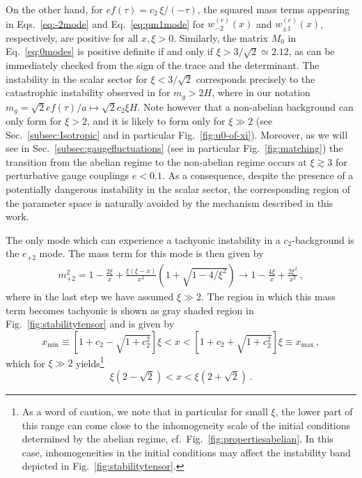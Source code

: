 On the other hand, for $e f(\tau) = c_2 \,  \xi/(- \tau)$, the squared mass terms appearing in Eqs.~\eqref{eq:-2mode} and Eq.~\eqref{eq:pm1mode} for $w_{-2}^{(e)}(x)$ and $w_{\pm1}^{(e)}(x)$, respectively, are positive for all $x, \xi > 0$. Similarly, the matrix $M_0$ in Eq.~\eqref{eq:0modes} is positive definite if and only if $\xi > 3/\sqrt{2} \simeq 2.12$, as can be immediately checked from the sign of the trace and the determinant. The instability in the scalar sector for $\xi < 3/\sqrt{2}$ corresponds precisely to the catastrophic instability observed in \cite{Dimastrogiovanni:2012ew} for $m_g > 2 H$, where in our notation $m_g = \sqrt{2} e f(\tau)/a \mapsto \sqrt{2} c_2 \xi H$. Note however that a non-abelian background can only form for $\xi > 2$, and it is likely to form only for $\xi \gg 2$ (see Sec.~\ref{subsec:Isotropic} and in particular Fig.~\ref{fig:u0-of-xi}). Moreover, as we will see in Sec.~\ref{subsec:gaugefluctuations} (see in particular Fig.~\ref{fig:matching}) the transition from the abelian regime to the non-abelian regime occurs at $\xi \gtrsim 3$ for perturbative gauge couplings $e < 0.1$. As a consequence, despite the presence of a potentially dangerous instability  in the scalar sector, the corresponding region of the parameter space is naturally avoided by the mechanism described in this work.



 The only mode which can experience a tachyonic instability in a $c_2$-background is the $e_{+2}$ mode. The mass term for this mode is then given by
\begin{align}
 m_{+2}^2 = 1 - \frac{2 \xi}{x} + \frac{\xi (\xi - x)}{x^2} \left(1 + \sqrt{1 - 4/\xi^2} \right) \rightarrow 1 - \frac{4 \xi}{x} + \frac{2 \xi^2}{x^2} \,,
 \label{eq:mass-term-2p}
\end{align}
where in the last step we have assumed $\xi \gg 2$.
The region in which this mass term becomes tachyonic is shown as gray shaded region in Fig.~\ref{fig:stabilitytensor} and is given by
\begin{equation}
 x_\text{min} \equiv \left[ 1 + c_2 - \sqrt{1 + c_2^2}\right] \xi < x <  \left[1 + c_2 + \sqrt{1 + c_2^2}\right] \xi  \equiv x_\text{max}\,,
 \label{eq:def-xmin-xmax}
\end{equation}
which for $\xi \gg 2$ yields\footnote{As a word of caution, we note that in particular for small $\xi$, the lower part of this range can come close to the inhomogeneity scale of the initial conditions determined by the abelian regime, cf.~Fig.~\ref{fig:propertiesabelian}. In this case, inhomogeneities in the initial conditions may affect the instability band depicted in Fig.~\ref{fig:stabilitytensor}.}
\begin{equation}
 \xi (2 - \sqrt{2}) < x < \xi (2 + \sqrt{2}) \,.
\end{equation}



